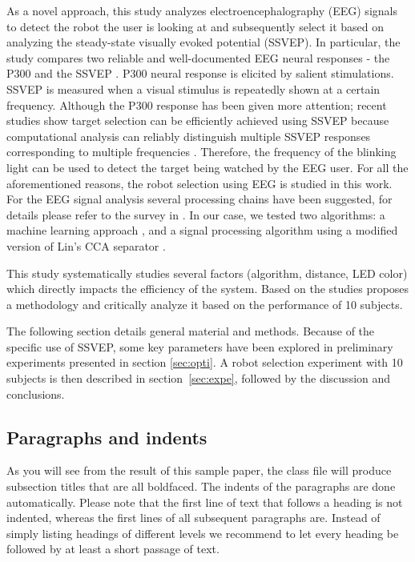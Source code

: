 \documentclass{svmult}
\begin{document}
As a novel approach, this study analyzes electroencephalography (EEG) signals to detect the robot the user is looking at and subsequently select it based on analyzing the steady-state visually evoked potential (SSVEP). In particular, the study compares two reliable and well-documented EEG neural responses - the P300 and the SSVEP \cite{Zhu2010, Bi2013, Beverina2003}. P300 neural response is elicited by salient stimulations. SSVEP is measured when a visual stimulus is repeatedly shown at a certain frequency. Although the P300 response has been given more attention; recent studies show target selection can be efficiently achieved using SSVEP because computational analysis can reliably distinguish multiple SSVEP responses corresponding to multiple frequencies \cite{SSVEPfiability}. Therefore, the frequency of the blinking light can be used to detect the target being watched by the EEG user. For all the aforementioned reasons, the robot selection using EEG is studied in this work. For the EEG signal analysis several processing chains have been suggested, for details please refer to the survey in \cite{Bi2013}. In our case, we tested two algorithms: a machine learning approach \cite{openvibeSSVEP}, and a signal processing algorithm using a modified version of Lin's CCA separator \cite{Lin2014}.

	This study systematically studies several factors (algorithm, distance, LED color) which directly impacts the efficiency of the system. Based on the studies proposes a methodology and critically analyze it based on the performance of 10 subjects.

The following section details general material and methods. Because of the specific use of SSVEP, some key parameters have been explored in preliminary experiments presented in section \ref{sec:opti}. A robot selection experiment with 10 subjects is then described in section~\ref{sec:expe}, followed by the discussion and conclusions.

\subsection{Paragraphs and indents}

As you will see from the result of this sample paper, the class file will produce subsection titles that are all boldfaced. The indents of the paragraphs are done automatically. Please note that the first line of text that follows a heading is not indented, whereas the first lines of all subsequent paragraphs are. Instead of simply listing headings of different levels we recommend to let every heading be followed by at least a short passage of text.
\end{document}
